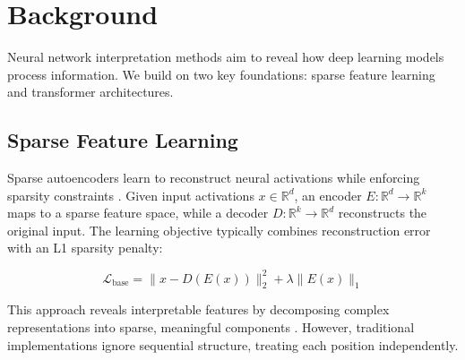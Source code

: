 \documentclass{article} %
\begin{document}
% 
%
%
%
%
%

\section{Background}
\label{sec:background}

Neural network interpretation methods aim to reveal how deep learning models process information. We build on two key foundations: sparse feature learning and transformer architectures.

\subsection{Sparse Feature Learning}
Sparse autoencoders learn to reconstruct neural activations while enforcing sparsity constraints \cite{Bengio2007LearningDA}. Given input activations $x \in \mathbb{R}^d$, an encoder $E: \mathbb{R}^d \rightarrow \mathbb{R}^k$ maps to a sparse feature space, while a decoder $D: \mathbb{R}^k \rightarrow \mathbb{R}^d$ reconstructs the original input. The learning objective typically combines reconstruction error with an L1 sparsity penalty:

\begin{equation}
    \mathcal{L}_{\text{base}} = \|x - D(E(x))\|_2^2 + \lambda\|E(x)\|_1
\end{equation}

This approach reveals interpretable features by decomposing complex representations into sparse, meaningful components \cite{Olshausen1996EmergenceOS}. However, traditional implementations ignore sequential structure, treating each position independently.
\end{document}
